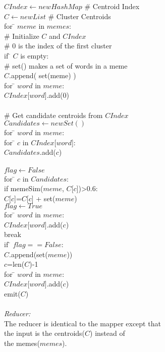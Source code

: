 \documentclass{sig-alternate}
\begin{document}
\begin{itemize}
\begin{centering}
\begin{tabbing}
$CIndex \leftarrow new HashMap$ \# Centroid Index\\
$C \leftarrow new List$ \# Cluster Centroids\\
for \= $meme$ in $memes$:\\
\>	\# Initialize $C$ and $CIndex$\\
\>	\# 0 is the index of the first cluster\\
\>	if \= $C$ is empty:\\
\>\>	\# set() makes a set of words in a meme\\
\>\>	$C$.append( set(meme) )\\
\>\>	for \= $word$ in $meme$:\\
\>\>\>		$CIndex$[$word$].add(0) \\
\\
\>	\# Get candidate centroids from $CIndex$\\
\>	$Candidates \leftarrow new Set()$\\
\>	for \= $word$ in $meme$:\\
\>\>		for \= $c$ in $CIndex$[$word$]:\\
\>\>\>		$Candidates$.add($c$)\\
\\
\>	$flag \leftarrow False$\\
\>	for \= $c$ in $Candidates$:\\
\>\>	if memeSim($meme$, $C$[$c$])>0.6:\\
\>\>\>		$C$[$c$]=$C$[$c$] + set($meme$)\\
\>\>\>	$flag \leftarrow True$\\
\>\>\>		for \= $word$ in $meme$:\\
\>\>\>\>		$CIndex$[$word$].add($c$) \\
\>\>\>		break
\\
\> if \= $flag == False$:\\
\>\>	$C$.append(set($meme$))\\
\>\>	$c$=len($C$)-1\\
\>\>		for \= $word$ in $meme$:\\
\>\>\>		$CIndex$[$word$].add($c$) \\
emit($C$)\\

\\
\emph{Reducer:}\\
\>The reducer is identical to the mapper except that \\
\> the input is the centroids($C$) instead of\\
\> the memes($memes$).\\

\end{tabbing}

\end{centering}

 
\end{itemize}
\end{document}
